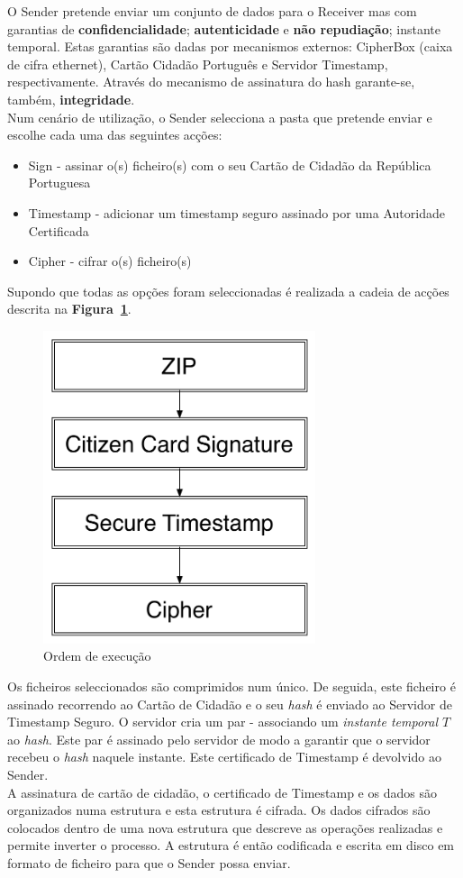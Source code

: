 O Sender pretende enviar um conjunto de dados para o Receiver mas com garantias de \textbf{confidencialidade}; \textbf{autenticidade} e \textbf{não repudiação}; instante temporal. Estas garantias são dadas por mecanismos externos: CipherBox (caixa de cifra ethernet), Cartão Cidadão Português e Servidor Timestamp, respectivamente. Através do mecanismo de assinatura do hash garante-se, também, \textbf{integridade}. \\

Num cenário de utilização, o Sender selecciona a pasta que pretende enviar e escolhe cada uma das seguintes acções:
\begin{itemize}
\item Sign - assinar o(s) ficheiro(s) com o seu Cartão de Cidadão da República Portuguesa
\item Timestamp - adicionar um timestamp seguro assinado por uma Autoridade Certificada
\item Cipher - cifrar o(s) ficheiro(s)
\end{itemize}

Supondo que todas as opções foram seleccionadas é realizada a cadeia de acções descrita na \textbf{Figura~\ref{fig:order}}. \\

\begin{figure}[htp]
\centering 
\includegraphics[width=8cm]{./Figures/Architecture.pdf}
\caption{Ordem de execução}
\label{fig:order}
\end{figure}

Os ficheiros seleccionados são comprimidos num único. De seguida, este ficheiro é assinado recorrendo ao Cartão de Cidadão e o seu \textit{hash} é enviado ao Servidor de Timestamp Seguro. O servidor cria um par - associando um \textit{instante temporal $T$} ao \textit{hash}. Este par é assinado pelo servidor de modo a garantir que o servidor recebeu o \textit{hash} naquele instante. Este certificado de Timestamp é devolvido ao Sender.\\ 
A assinatura de cartão de cidadão, o certificado de Timestamp e os dados são organizados numa estrutura e esta estrutura é cifrada. Os dados cifrados são colocados dentro de uma nova estrutura que descreve as operações realizadas e permite inverter o processo. A estrutura é então codificada e escrita em disco em formato de ficheiro para que o Sender possa enviar. \\
 
